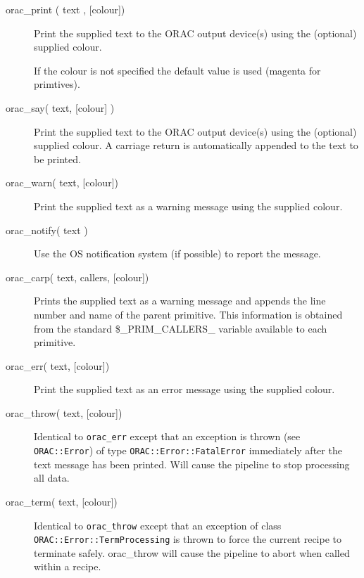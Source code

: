 \begin{description}

\item[{orac\_print ( text , [colour])}] \mbox{}

Print the supplied text to the ORAC output device(s)
using the (optional) supplied colour.



If the colour is not specified the default value is used (magenta
for primtives).


\item[{orac\_say( text, [colour] )}] \mbox{}

Print the supplied text to the ORAC output device(s) using the (optional) supplied colour. A carriage return is automatically appended to the text to be printed.


\item[{orac\_warn( text, [colour])}] \mbox{}

Print the supplied text as a warning message using the supplied
colour.


\item[{orac\_notify( text )}] \mbox{}

Use the OS notification system (if possible) to report the message.


\item[{orac\_carp( text, callers, [colour])}] \mbox{}

Prints the supplied text as a warning message and appends the line number
and name of the parent primitive. This information is obtained from the
standard \$\_PRIM\_CALLERS\_ variable available to each primitive.


\item[{orac\_err( text, [colour])}] \mbox{}

Print the supplied text as an error message using the supplied
colour.


\item[{orac\_throw( text, [colour])}] \mbox{}

Identical to \texttt{orac\_err} except that an exception is thrown (see
\texttt{ORAC::Error}) of type \texttt{ORAC::Error::FatalError} immediately after
the text message has been printed. Will cause the pipeline to stop
processing all data.


\item[{orac\_term( text, [colour])}] \mbox{}

Identical to \texttt{orac\_throw} except that an exception of class
\texttt{ORAC::Error::TermProcessing} is thrown to force the current recipe
to terminate safely. orac\_throw will cause the pipeline to abort when
called within a recipe.



\end{description}
